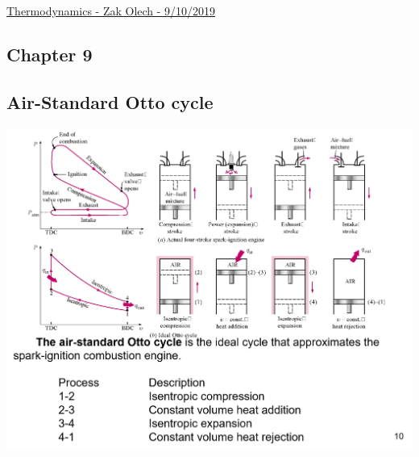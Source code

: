 \documentclass{article}
\newenvironment{Figure}
     {\par\medskip\noindent\minipage{\linewidth}}
     {\endminipage\par\medskip}
\begin{document}
\raggedright
\footnotesize

\begin{center}
     \Large{\underline{Thermodynamics - Zak Olech - 9/10/2019}}
\end{center}

\begin{multicols}{3}

\setlength{\premulticols}{1pt}
\setlength{\postmulticols}{1pt}
\setlength{\multicolsep}{1pt}
\setlength{\columnsep}{2pt}



\section{Chapter 9}
\subsection{Air-Standard Otto cycle}
\lipsum[1]
\begin{Figure}
    \centering
    \includegraphics[width=\linewidth]{Air-Standard_OttoCycle.png}
\end{Figure}

\end{multicols}
\end{document}
